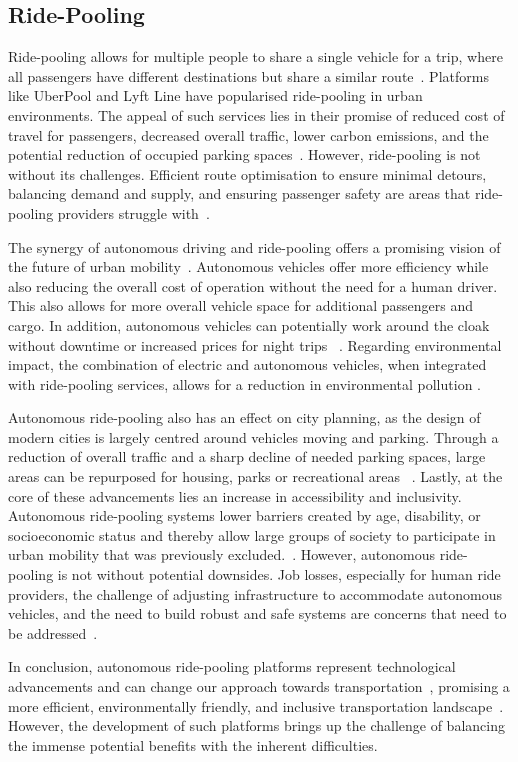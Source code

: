 \subsection{Ride-Pooling}
Ride-pooling allows for multiple people to share a single vehicle for a trip, where all passengers have different destinations but share a similar route~\cite{Perivier.}. 
Platforms like UberPool and Lyft Line have popularised ride-pooling in urban environments. The appeal of such services lies in their promise of reduced cost of travel for passengers, decreased overall traffic, lower carbon emissions, and the potential reduction of occupied parking spaces~\cite{Shaheen.}. However, ride-pooling is not without its challenges. Efficient route optimisation to ensure minimal detours, balancing demand and supply, and ensuring passenger safety are areas that ride-pooling providers struggle with~\cite{Perivier.}. 

The synergy of autonomous driving and ride-pooling offers a promising vision of the future of urban mobility~\cite{Stamadianos.2023}. Autonomous vehicles offer more efficiency while also reducing the overall cost of operation without the need for a human driver. This also allows for more overall vehicle space for additional passengers and cargo. In addition, autonomous vehicles can potentially work around the cloak without downtime or increased prices for night trips ~\cite{Hacohen.2022,Stamadianos.2023}. Regarding environmental impact, the combination of electric and autonomous vehicles, when integrated with ride-pooling services, allows  for a reduction in environmental pollution \cite{Hacohen.2022,Stamadianos.2023}. 
 
Autonomous ride-pooling also has an effect on city planning, as the design of modern cities is largely centred around vehicles moving and parking. Through a reduction of overall traffic and a sharp decline of needed parking spaces, large areas can be repurposed for housing, parks or recreational areas ~\cite{Stamadianos.2023}. Lastly, at the core of these advancements lies an increase in accessibility and inclusivity.  Autonomous ride-pooling systems lower barriers created by age, disability, or socioeconomic status and thereby allow large groups of society to participate in urban mobility that was previously excluded.~\cite{Hacohen.2022}.
However, autonomous ride-pooling is not without potential downsides. Job losses, especially for  human ride providers, the challenge of adjusting infrastructure to accommodate autonomous vehicles, and the need to build robust and safe systems are concerns that need to be addressed~\cite{Hacohen.2022}.

In conclusion, autonomous ride-pooling platforms represent technological advancements and can change our approach towards transportation~\cite{Shaheen.}, promising a more efficient, environmentally friendly, and inclusive transportation landscape~\cite{Stamadianos.2023}. However, the development of such platforms brings up the challenge of balancing the immense potential benefits with the inherent difficulties. 